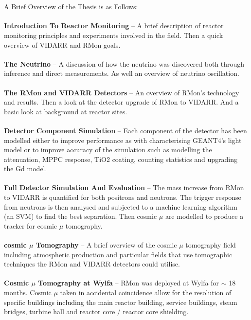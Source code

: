 \\\\A Brief Overview of the Thesis is as Follows:
\\\\\textbf{Introduction To Reactor Monitoring} -- A brief description of reactor monitoring principles and experiments involved in the field. Then a quick overview of VIDARR and RMon goals.  
\\\\\textbf{The Neutrino} -- A discussion of how the neutrino was discovered both through inference and direct measurements. As well an overview of neutrino oscillation.
\\\\\textbf{The RMon and VIDARR Detectors} -- An overview of RMon's technology and results. Then a look at the detector upgrade of RMon to VIDARR. And a basic look at background at reactor sites.
\\\\\textbf{Detector Component Simulation} -- Each component of the detector has been modelled either to improve performance as with characterising GEANT4's light model or to improve accuracy of the simulation such as modelling the attenuation, MPPC response, TiO2 coating, counting statistics and upgrading the Gd model. 
\\\\\textbf{Full Detector Simulation And Evaluation} -- The mass increase from RMon to VIDARR is quantified for both positrons and neutrons. The trigger response from neutrons is then analysed and subjected to a machine learning algorithm (an SVM) to find the best separation. Then cosmic $\mu$ are modelled to produce a tracker for cosmic $\mu$ tomography.
\\\\\textbf{cosmic $\mu$ Tomography} -- A brief overview of the cosmic $\mu$ tomography field including atmospheric production and particular fields that use tomographic techniques the RMon and VIDARR detectors could utilise. 
\\\\\textbf{Cosmic $\mu$ Tomography at Wylfa} -- RMon was deployed at Wylfa for $\sim$ 18 months. Cosmic $\mu$ taken in accidental coincidence allow for the resolution of specific buildings including the main reactor building, service buildings, steam bridges, turbine hall and reactor core / reactor core shielding.